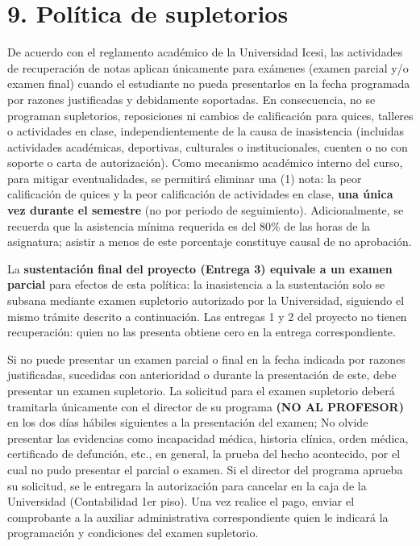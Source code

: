 \documentclass[11pt,a4paper]{article}
\begin{document}
\section*{9. Política de supletorios}

De acuerdo con el reglamento académico de la Universidad Icesi, las actividades de recuperación de notas aplican únicamente para exámenes (examen parcial y/o examen final) cuando el estudiante no pueda presentarlos en la fecha programada por razones justificadas y debidamente soportadas. En consecuencia, no se programan supletorios, reposiciones ni cambios de calificación para quices, talleres o actividades en clase, independientemente de la causa de inasistencia (incluidas actividades académicas, deportivas, culturales o institucionales, cuenten o no con soporte o carta de autorización). Como mecanismo académico interno del curso, para mitigar eventualidades, se permitirá eliminar una (1) nota: la peor calificación de quices y la peor calificación de actividades en clase, \textbf{una única vez durante el semestre} (no por periodo de seguimiento). Adicionalmente, se recuerda que la asistencia mínima requerida es del 80\% de las horas de la asignatura; asistir a menos de este porcentaje constituye causal de no aprobación.

\vspace{0.3cm}

La \textbf{sustentación final del proyecto (Entrega 3) equivale a un examen parcial} para efectos de esta política: la inasistencia a la sustentación solo se subsana mediante examen supletorio autorizado por la Universidad, siguiendo el mismo trámite descrito a continuación. Las entregas 1 y 2 del proyecto no tienen recuperación: quien no las presenta obtiene cero en la entrega correspondiente.

\vspace{0.3cm}

Si no puede presentar un examen parcial o final en la fecha indicada por razones justificadas, sucedidas con anterioridad o durante la presentación de este, debe presentar un examen supletorio. La solicitud para el examen supletorio deberá tramitarla únicamente con el director de su programa \textbf{(NO AL PROFESOR)} en los dos días hábiles siguientes a la presentación del examen; No olvide presentar las evidencias como incapacidad médica, historia clínica, orden médica, certificado de defunción, etc., en general, la prueba del hecho acontecido, por el cual no pudo presentar el parcial o examen. Si el director del programa aprueba su solicitud, se le entregara la autorización para cancelar en la caja de la Universidad (Contabilidad 1er piso). Una vez realice el pago, enviar el comprobante a la auxiliar administrativa correspondiente quien le indicará la programación y condiciones del examen supletorio.
\end{document}
